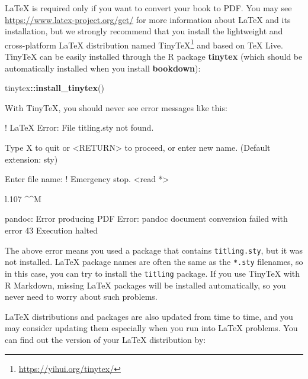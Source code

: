 \documentclass[
  12pt,
]{krantz}
\newenvironment{Shaded}{\begin{snugshade}}{\end{snugshade}}
\newcommand{\FunctionTok}[1]{\textcolor[rgb]{0.13,0.29,0.53}{\textbf{#1}}}
\newcommand{\NormalTok}[1]{#1}
\newcommand{\SpecialCharTok}[1]{\textcolor[rgb]{0.81,0.36,0.00}{\textbf{#1}}}
\renewcommand{\href}[2]{#2\footnote{\url{#1}}}
\theoremstyle{definition}
\theoremstyle{definition}
\theoremstyle{definition}
\theoremstyle{definition}
\theoremstyle{remark}
\begin{document}
LaTeX is required only if you want to convert your book to PDF. You may see \url{https://www.latex-project.org/get/} for more information about LaTeX and its installation, but we strongly recommend that you install the lightweight and cross-platform LaTeX distribution named \href{https://yihui.org/tinytex/}{TinyTeX} and based on TeX Live. TinyTeX can be easily installed through the R package \textbf{tinytex} (which should be automatically installed when you install \textbf{bookdown}):

\begin{Shaded}
\begin{Highlighting}[]
\NormalTok{tinytex}\SpecialCharTok{::}\FunctionTok{install\_tinytex}\NormalTok{()}
\end{Highlighting}
\end{Shaded}

With TinyTeX, you should never see error messages like this:

\begin{Shaded}
\begin{Highlighting}[]
\NormalTok{! LaTeX Error: File \textasciigrave{}titling.sty\textquotesingle{} not found.}

\NormalTok{Type X to quit or \textless{}RETURN\textgreater{} to proceed,}
\NormalTok{or enter new name. (Default extension: sty)}

\NormalTok{Enter file name: }
\NormalTok{! Emergency stop.}
\NormalTok{\textless{}read *\textgreater{} }
         
\NormalTok{l.107 \^{}\^{}M}

\NormalTok{pandoc: Error producing PDF}
\NormalTok{Error: pandoc document conversion failed with error 43}
\NormalTok{Execution halted}
\end{Highlighting}
\end{Shaded}

The above error means you used a package that contains \texttt{titling.sty}, but it was not installed. LaTeX package names are often the same as the \texttt{*.sty} filenames, so in this case, you can try to install the \texttt{titling} package. If you use TinyTeX with R Markdown, missing LaTeX packages will be installed automatically, so you never need to worry about such problems.

LaTeX distributions and packages are also updated from time to time, and you may consider updating them especially when you run into LaTeX problems. You can find out the version of your LaTeX distribution by:
\end{document}
